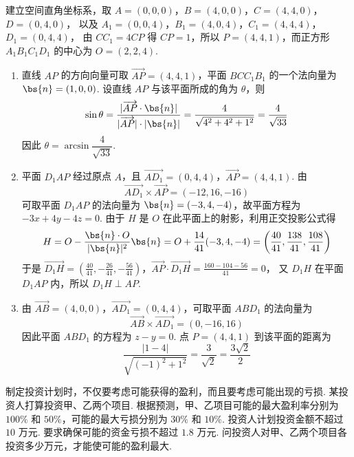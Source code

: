 \begin{solution}
建立空间直角坐标系，取
\(A=(0,0,0)\)，\(B=(4,0,0)\)，\(C=(4,4,0)\)，\(D=(0,4,0)\)，
以及
\(A_1=(0,0,4)\)，\(B_1=(4,0,4)\)，\(C_1=(4,4,4)\)，\(D_1=(0,4,4)\)，
由 \(CC_1=4CP\) 得 \(CP=1\)，所以 \(P=(4,4,1)\)，而正方形 \(A_1B_1C_1D_1\) 的中心为 \(O=(2,2,4)\).

\begin{enumerate}
\item 直线 \(AP\) 的方向向量可取 \(\overrightarrow{AP}=(4,4,1)\)，平面 \(BCC_1B_1\) 的一个法向量为 \(\bs{n}=(1,0,0)\). 设直线 \(AP\) 与该平面所成的角为 \(\theta\)，则
\[
\sin\theta=\frac{|\overrightarrow{AP}\cdot\bs{n}|}{|\overrightarrow{AP}|\cdot|\bs{n}|}=\frac4{\sqrt{4^2+4^2+1^2}}=\frac4{\sqrt{33}}
\]
因此 \(\theta=\arcsin\dfrac4{\sqrt{33}}\).

\item 平面 \(D_1AP\) 经过原点 \(A\)，且 \(\overrightarrow{AD_1}=(0,4,4)\)，\(\overrightarrow{AP}=(4,4,1)\). 由
\[
\overrightarrow{AD_1}\times\overrightarrow{AP}=(-12,16,-16)
\]
可取平面 \(D_1AP\) 的法向量为 \(\bs{n}=(-3,4,-4)\)，故平面方程为 \(-3x+4y-4z=0\). 由于 \(H\) 是 \(O\) 在此平面上的射影，利用正交投影公式得
\[
H=O-\frac{\bs{n}\cdot O}{|\bs{n}|^2}\bs{n}=O+\frac{14}{41}(-3,4,-4)=\left(\frac{40}{41},\frac{138}{41},\frac{108}{41}\right)
\]
于是
\(\overrightarrow{D_1H}=\left(\frac{40}{41},-\frac{26}{41},-\frac{56}{41}\right)\)，\(\overrightarrow{AP}\cdot\overrightarrow{D_1H}=\frac{160-104-56}{41}=0\)，
又 \(D_1H\) 在平面 \(D_1AP\) 内，所以 \(D_1H\perp AP\).

\item 由 \(\overrightarrow{AB}=(4,0,0)\)，\(\overrightarrow{AD_1}=(0,4,4)\)，可取平面 \(ABD_1\) 的法向量为
\[
\overrightarrow{AB}\times\overrightarrow{AD_1}=(0,-16,16)
\]
因此平面 \(ABD_1\) 的方程为 \(z-y=0\). 点 \(P=(4,4,1)\) 到该平面的距离为
\[
\frac{|1-4|}{\sqrt{(-1)^2+1^2}}=\frac3{\sqrt2}=\frac{3\sqrt2}{2}
\]
\end{enumerate}
\end{solution}

\begin{problem}
制定投资计划时，不仅要考虑可能获得的盈利，而且要考虑可能出现的亏损. 某投资人打算投资甲、乙两个项目. 根据预测，甲、乙项目可能的最大盈利率分别为 \(100\%\) 和 \(50\%\)，可能的最大亏损分别为 \(30\%\) 和 \(10\%\). 投资人计划投资金额不超过 \(10\text{ 万元}\). 要求确保可能的资金亏损不超过 \(1.8\text{ 万元}\). 问投资人对甲、乙两个项目各投资多少万元，才能使可能的盈利最大.
\end{problem}

